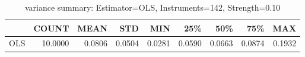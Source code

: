 \begin{table}[ht]
\centering
\caption{variance summary: Estimator=OLS, Instruments=142, Strength=0.10}
\begin{tabular}{lrrrrrrrr}
\toprule
 & COUNT & MEAN & STD & MIN & 25\% & 50\% & 75\% & MAX \\
\midrule
OLS & 10.0000 & 0.0806 & 0.0504 & 0.0281 & 0.0590 & 0.0663 & 0.0874 & 0.1932 \\
\bottomrule
\end{tabular}
\end{table}

